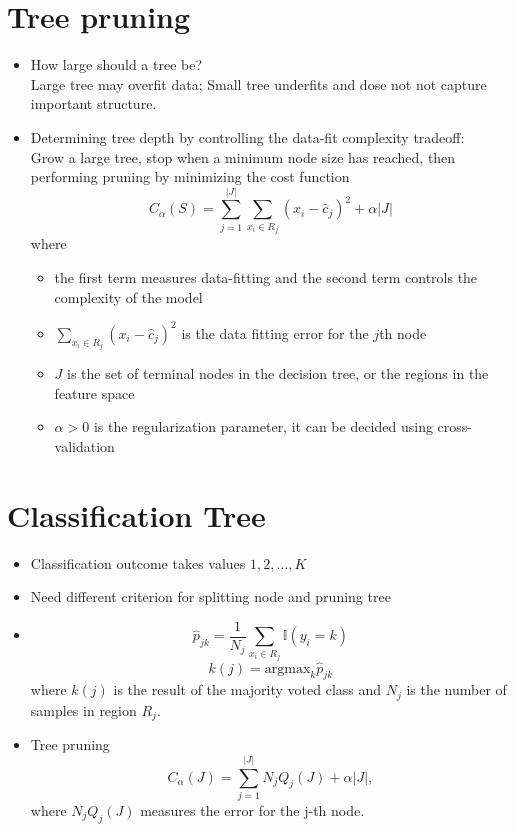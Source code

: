\documentclass[twoside,12pt]{article}
\begin{document}
\section{Tree pruning}
\begin{itemize}
\item How large should a tree be?\\
Large tree may overfit data; Small tree underfits and dose not not capture important structure. 
\item Determining tree depth by controlling the data-fit complexity tradeoff:\\
Grow a large tree, stop when a minimum node size has reached, then performing pruning by minimizing the cost function
$$C_{\alpha}(S) = \sum_{j=1}^{|J|} \sum_{x_i\in R_j} (x_i - \hat{c}_j)^2 + \alpha |J|$$
where 
\begin{itemize}
\item the first term measures data-fitting and the second term controls the complexity of the model
\item $\sum_{x_i\in R_j} (x_i - \hat{c}_j)^2$ is the data fitting error for the $j$th node 
\item $J$ is the set of terminal nodes in the decision tree, or the regions in the feature space
\item $\alpha > 0$ is the regularization parameter, it can be decided using cross-validation 
\end{itemize}
\end{itemize}
\section{Classification Tree}
\begin{itemize}
\item Classification outcome takes values $1,2,...,K$
\item Need different criterion for splitting node and pruning tree
\item $$\hat{p}_{jk} = \frac 1 {N_j} \sum_{x_i \in R_j} \mathbb{I}(y_i = k)$$
$$k(j) = \text{argmax}_k \hat{p}_{jk}$$
where $k(j)$ is the result of the majority voted class and $N_j$ is the number of samples in region $R_j$.
\item Tree pruning
$$C_{\alpha}(J) = \sum_{j=1}^{|J|} N_j Q_j(J) + \alpha |J|,$$
where $N_j Q_j(J)$ measures the error for the j-th node. 
\end{itemize}
\end{document}
